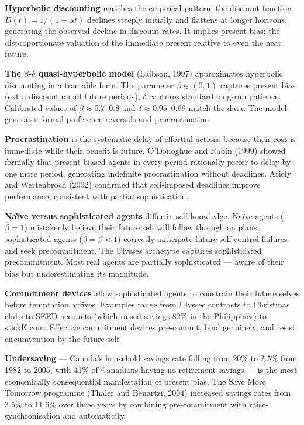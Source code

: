 \documentclass[12pt, letterpaper]{article}
\begin{document}
\textbf{Hyperbolic discounting} matches the empirical pattern: the discount function $D(t) = 1/(1+\alpha t)$ declines steeply initially and flattens at longer horizons, generating the observed decline in discount rates. It implies present bias: the disproportionate valuation of the immediate present relative to even the near future.

\textbf{The $\beta$-$\delta$ quasi-hyperbolic model} (Laibson, 1997) approximates hyperbolic discounting in a tractable form. The parameter $\beta \in (0,1)$ captures present bias (extra discount on all future periods); $\delta$ captures standard long-run patience. Calibrated values of $\beta \approx 0.7$--0.8 and $\delta \approx 0.95$--0.99 match the data. The model generates formal preference reversals and procrastination.

\textbf{Procrastination} is the systematic delay of effortful actions because their cost is immediate while their benefit is future. O'Donoghue and Rabin (1999) showed formally that present-biased agents in every period rationally prefer to delay by one more period, generating indefinite procrastination without deadlines. Ariely and Wertenbroch (2002) confirmed that self-imposed deadlines improve performance, consistent with partial sophistication.

\textbf{Naïve versus sophisticated agents} differ in self-knowledge. Naïve agents ($\hat{\beta} = 1$) mistakenly believe their future self will follow through on plans; sophisticated agents ($\hat{\beta} = \beta < 1$) correctly anticipate future self-control failures and seek precommitment. The Ulysses archetype captures sophisticated precommitment. Most real agents are partially sophisticated --- aware of their bias but underestimating its magnitude.

\textbf{Commitment devices} allow sophisticated agents to constrain their future selves before temptation arrives. Examples range from Ulysses contracts to Christmas clubs to SEED accounts (which raised savings 82\% in the Philippines) to stickK.com. Effective commitment devices pre-commit, bind genuinely, and resist circumvention by the future self.

\textbf{Undersaving} --- Canada's household savings rate falling from 20\% to 2.5\% from 1982 to 2005, with 41\% of Canadians having no retirement savings --- is the most economically consequential manifestation of present bias. The Save More Tomorrow programme (Thaler and Benartzi, 2004) increased savings rates from 3.5\% to 11.6\% over three years by combining pre-commitment with raise-synchronisation and automaticity.
\end{document}
